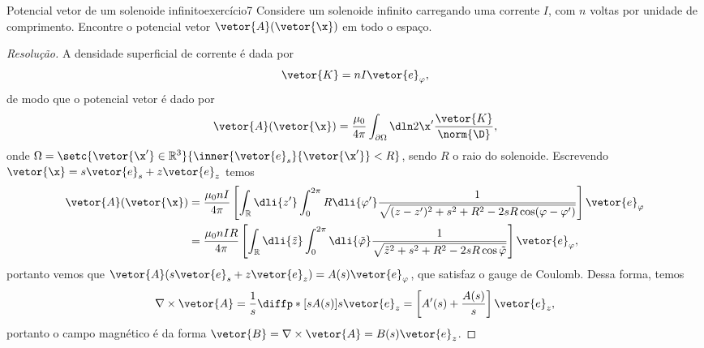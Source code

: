 \begin{exercício}{Potencial vetor de um solenoide infinito}{exercício7}
    Considere um solenoide infinito carregando uma corrente \(I\), com \(n\) voltas por unidade de comprimento. Encontre o potencial vetor \(\vetor{A}(\vetor{\x})\) em todo o espaço.
\end{exercício}
\begin{proof}[Resolução]
    A densidade superficial de corrente é dada por
    \begin{equation*}
        \vetor{K} = n I \vetor{e}_{\varphi},
    \end{equation*}
    de modo que o potencial vetor é dado por
    \begin{equation*}
        \vetor{A}(\vetor{\x}) = \frac{\mu_0}{4\pi}\int_{\partial\Omega} \dln2{\x'} \frac{\vetor{K}}{\norm{\D}},
    \end{equation*}
    onde \(\Omega = \setc{\vetor{\x'} \in \mathbb{R}^3}{\inner{\vetor{e}_s}{\vetor{\x'}} < R}\), sendo \(R\) o raio do solenoide. Escrevendo \(\vetor{\x} = s \vetor{e}_s + z \vetor{e}_z\) temos
    \begin{align*}
        \vetor{A}(\vetor{\x}) &= \frac{\mu_0 n I}{4\pi} \left[\int_{\mathbb{R}} \dli{z'} \int_{0}^{2\pi} R \dli{\varphi'} \frac{1}{\sqrt{(z - z')^2 + s^2 + R^2 - 2 s R \cos(\varphi - \varphi')}}\right]\vetor{e}_\varphi\\
                              &= \frac{\mu_0 n IR}{4\pi}\left[\int_{\mathbb{R}} \dli{\tilde{z}} \int_{0}^{2\pi}\dli{\tilde{\varphi}} \frac{1}{\sqrt{\tilde{z}^2 + s^2 + R^2 - 2 s R \cos\tilde{\varphi}}}\right]\vetor{e}_\varphi,
    \end{align*}
    portanto vemos que \(\vetor{A}(s \vetor{e}_s + z\vetor{e}_z) = A(s)\vetor{e}_\varphi\), que satisfaz o gauge de Coulomb. Dessa forma, temos
    \begin{equation*}
        \nabla\times \vetor{A} = \frac{1}{s} \diffp*{\left[s A(s)\right]}{s} \vetor{e}_z = \left[A'(s) + \frac{A(s)}{s}\right]\vetor{e}_z,
    \end{equation*}
    portanto o campo magnético é da forma \(\vetor{B} = \nabla\times \vetor{A} = B(s) \vetor{e}_z\).


\end{proof}
